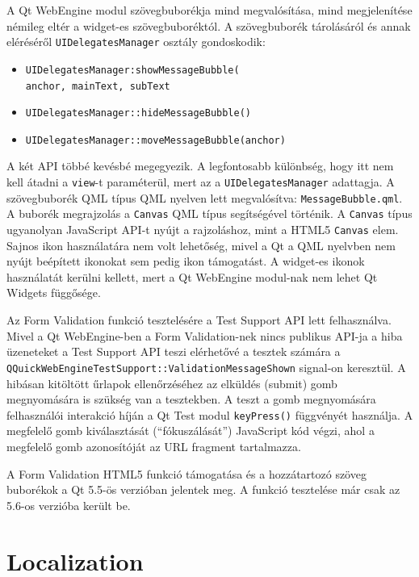 \documentclass[12pt]{report}
\begin{document}
A Qt WebEngine modul szövegbuborékja mind megvalósítása, mind megjelenítése némileg eltér
a widget-es szövegbuboréktól. A szövegbuborék tárolásáról és annak eléréséről
\texttt{UIDelegatesManager} osztály gondoskodik:
\begin{itemize}
    \item \texttt{UIDelegatesManager:showMessageBubble(} \\
                    \texttt{anchor, mainText, subText}
    \item \texttt{UIDelegatesManager::hideMessageBubble()}
    \item \texttt{UIDelegatesManager::moveMessageBubble(anchor)}
\end{itemize}
A két API többé kevésbé megegyezik. A legfontosabb különbség, hogy itt nem kell átadni a
\texttt{view}-t paraméterül, mert az a \texttt{UIDelegatesManager} adattagja. A szövegbuborék
QML típus QML nyelven lett megvalósítva: \texttt{MessageBubble.qml}. A buborék
megrajzolás a \texttt{Canvas} QML típus segítségével történik. A \texttt{Canvas} típus
ugyanolyan JavaScript API-t nyújt a rajzoláshoz, mint a HTML5 \texttt{Canvas} elem.
Sajnos ikon használatára nem volt lehetőség, mivel a Qt a QML nyelvben nem nyújt beépített
ikonokat sem pedig ikon támogatást. A widget-es ikonok használatát kerülni kellett, mert
a Qt WebEngine modul-nak nem lehet Qt Widgets függősége.

Az Form Validation funkció tesztelésére a Test Support API lett felhasználva. Mivel a
Qt WebEngine-ben a Form Validation-nek nincs publikus API-ja a hiba üzeneteket a
Test Support API teszi elérhetővé a tesztek számára a \\
\texttt{QQuickWebEngineTestSupport::ValidationMessageShown}
signal-on keresztül. A hibásan kitöltött űrlapok ellenőrzéséhez az elküldés (submit) gomb
megnyomására is szükség van a tesztekben. A teszt a gomb megnyomására felhasználói interakció
híján a Qt Test modul \texttt{keyPress()} függvényét használja. A megfelelő gomb
kiválasztását (``fókuszálását'') JavaScript kód végzi, ahol a megfelelő gomb azonosítóját
az URL fragment tartalmazza.

A Form Validation HTML5 funkció támogatása és a hozzátartozó szöveg buborékok a Qt 5.5-ös
verzióban jelentek meg. A funkció tesztelése már csak az 5.6-os verzióba került be.

\pagebreak
\section{Localization}
\end{document}
